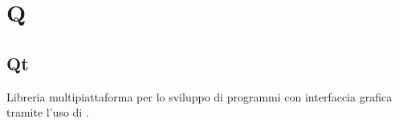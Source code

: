 \section*{Q}
\markright{}

\subsection*{Qt}
Libreria multipiattaforma per lo sviluppo di programmi con interfaccia grafica tramite l'uso di .